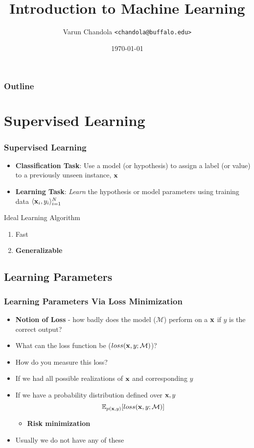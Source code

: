 \documentclass[10pt]{beamer}
\title{Introduction to Machine Learning}
\date{\today}
\author[Varun Chandola]{Varun Chandola \texttt{<chandola@buffalo.edu>}}
\begin{document}
\maketitle
\begin{frame}
  \frametitle{Outline}
  \tableofcontents[hideallsubsections]
\end{frame}
\section{Supervised Learning}
\begin{frame}
  \frametitle{Supervised Learning}
  \begin{itemize}
  \item {\bf Classification Task}: Use a model (or hypothesis) to assign a label (or value) to a previously unseen instance, ${\bf x}$
  \item {\bf Learning Task}: {\em Learn} the hypothesis or model parameters using training data $\langle {\bf x}_i, y_i\rangle_{i=1}^N$
  \end{itemize}
  \begin{block}{Ideal Learning Algorithm}
    \begin{enumerate}
      \item Fast
      \item {\bf Generalizable}
    \end{enumerate}
  \end{block}
\end{frame}
\subsection{Learning Parameters}
\begin{frame}
  \frametitle{Learning Parameters Via Loss Minimization}
  \begin{itemize}
  \item {\bf Notion of Loss} - how badly does the model ($\mathcal{M}$) perform on a ${\bf x}$ if $y$ is the correct output?
  \item What can the loss function be ($loss({\bf x},y;\mathcal{M})$)?
  \item How do you measure this loss?
    \pause
  \item If we had all possible realizations of ${\bf x}$ and corresponding $y$
  \item If we have a probability distribution defined over ${\bf x},y$ 
    \[
    \mathbb{E}_{p({\bf x},y)}[loss({\bf x},y;\mathcal{M})]
    \]
    \begin{itemize}
    \item {\bf Risk minimization}
    \end{itemize}
  \item Usually we do not have any of these
  \end{itemize}
\end{frame}
\end{document}
